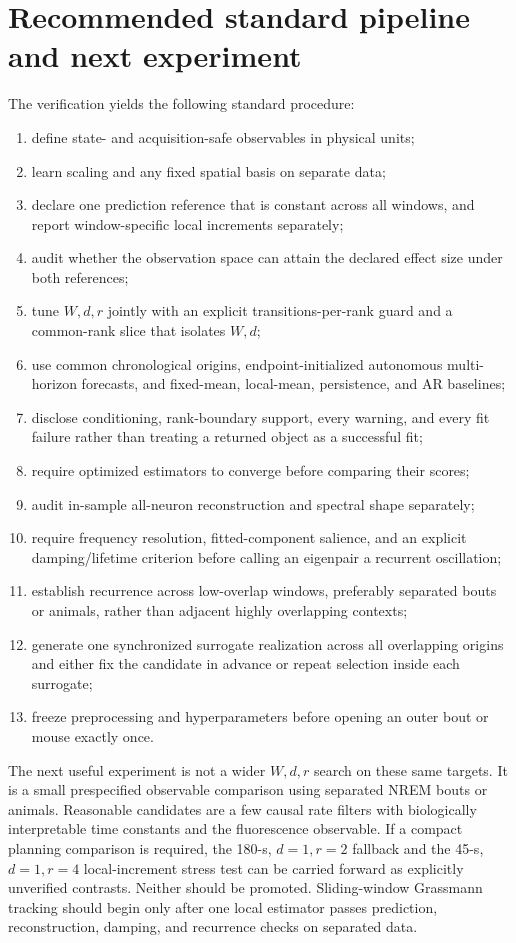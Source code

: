 \documentclass[11pt]{article}
\begin{document}
\section{Recommended standard pipeline and next experiment}

The verification yields the following standard procedure:
\begin{enumerate}
\item define state- and acquisition-safe observables in physical units;
\item learn scaling and any fixed spatial basis on separate data;
\item declare one prediction reference that is constant across all windows,
and report window-specific local increments separately;
\item audit whether the observation space can attain the declared effect size
under both references;
\item tune \(W,d,r\) jointly with an explicit transitions-per-rank guard and a
common-rank slice that isolates \(W,d\);
\item use common chronological origins, endpoint-initialized autonomous
multi-horizon forecasts, and fixed-mean, local-mean, persistence, and AR
baselines;
\item disclose conditioning, rank-boundary support, every warning, and every
fit failure rather than treating a returned object as a successful fit;
\item require optimized estimators to converge before comparing their scores;
\item audit in-sample all-neuron reconstruction and spectral shape separately;
\item require frequency resolution, fitted-component salience, and an
explicit damping/lifetime criterion before calling an eigenpair a recurrent
oscillation;
\item establish recurrence across low-overlap windows, preferably separated
bouts or animals, rather than adjacent highly overlapping contexts;
\item generate one synchronized surrogate realization across all overlapping
origins and either fix the candidate in advance or repeat selection inside
each surrogate;
\item freeze preprocessing and hyperparameters before opening an outer bout or
mouse exactly once.
\end{enumerate}

The next useful experiment is not a wider \(W,d,r\) search on these same
targets.  It is a small prespecified observable comparison using separated
NREM bouts or animals.  Reasonable candidates are a few causal rate filters
with biologically interpretable time constants and the fluorescence
observable.  If a compact planning comparison is required, the 180-s,
\(d=1,r=2\) fallback and the 45-s, \(d=1,r=4\) local-increment stress test can
be carried forward as explicitly unverified contrasts.  Neither should be
promoted.  Sliding-window Grassmann tracking should begin only after one local
estimator passes prediction, reconstruction, damping, and recurrence checks
on separated data.
\end{document}
